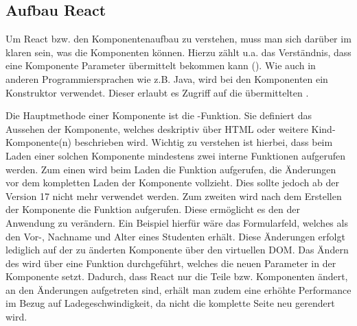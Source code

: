 
\subsection{Aufbau React}
\label{ssec:AufbauReact}

Um React bzw. den Komponentenaufbau zu verstehen, muss man sich darüber im klaren sein, was die Komponenten können. 
Hierzu zählt u.a. das Verständnis, dass eine Komponente Parameter übermittelt bekommen kann (\props). 
Wie auch in anderen Programmiersprachen wie z.B. Java, wird bei den Komponenten ein Konstruktor  verwendet.
Dieser erlaubt es Zugriff auf die übermittelten \props. 

Die Hauptmethode einer Komponente ist die \render-Funktion. 
Sie definiert das Aussehen der Komponente, welches deskriptiv über \acs{HTML} oder weitere Kind-Kompo\-nente(n) beschrieben wird. 
Wichtig zu verstehen ist hierbei, dass beim Laden einer solchen Komponente mindestens zwei interne Funktionen aufgerufen werden. 
Zum einen wird beim Laden die Funktion \cwm aufgerufen, die Änderungen vor dem kompletten Laden der Komponente vollzieht.
Dies sollte jedoch ab der Version 17 nicht mehr verwendet werden. 
Zum zweiten wird nach dem Erstellen der Komponente die Funktion \cdm aufgerufen. 
Diese ermöglicht es \zb den \state  der Anwendung zu verändern. 
Ein Beispiel hierfür wäre das Formularfeld, welches als \props den Vor-, Nachname und Alter eines Studenten erhält. 
Diese Änderungen erfolgt lediglich auf der zu änderten Komponente über den virtuellen \acs{DOM}. 
Das Ändern des \state wird über eine Funktion \exampleState durchgeführt, welches die neuen Parameter in der Komponente setzt.
Dadurch, dass React nur die Teile bzw. Komponenten ändert, an den Änderungen aufgetreten sind, erhält man zudem eine erhöhte Performance im Bezug auf Ladegeschwindigkeit, da nicht die komplette Seite neu gerendert wird. 

